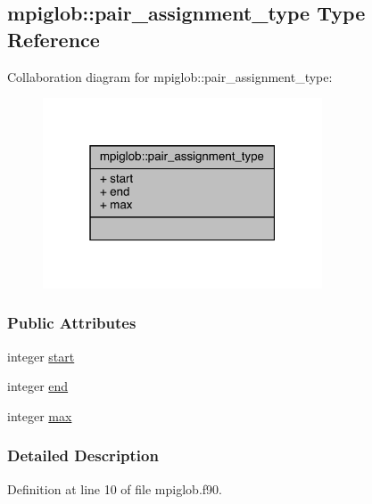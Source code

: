 \hypertarget{structmpiglob_1_1pair__assignment__type}{\subsection{mpiglob\-:\-:pair\-\_\-assignment\-\_\-type Type Reference}
\label{structmpiglob_1_1pair__assignment__type}
}


Collaboration diagram for mpiglob\-:\-:pair\-\_\-assignment\-\_\-type\-:
\nopagebreak
\begin{figure}[H]
\begin{center}
\leavevmode
\includegraphics[width=235pt]{structmpiglob_1_1pair__assignment__type__coll__graph}
\end{center}
\end{figure}
\subsubsection*{Public Attributes}
\begin{DoxyCompactItemize}
\item 
integer \hyperlink{structmpiglob_1_1pair__assignment__type_a89cf6316a4b25d1a85ee34cc9c9ddc17}{start}
\item 
integer \hyperlink{structmpiglob_1_1pair__assignment__type_af63559b30e5a0444b5c0908dcccbd035}{end}
\item 
integer \hyperlink{structmpiglob_1_1pair__assignment__type_ac824ffaaef5ea4e45d4decc25291d0e4}{max}
\end{DoxyCompactItemize}


\subsubsection{Detailed Description}


Definition at line 10 of file mpiglob.\-f90.



